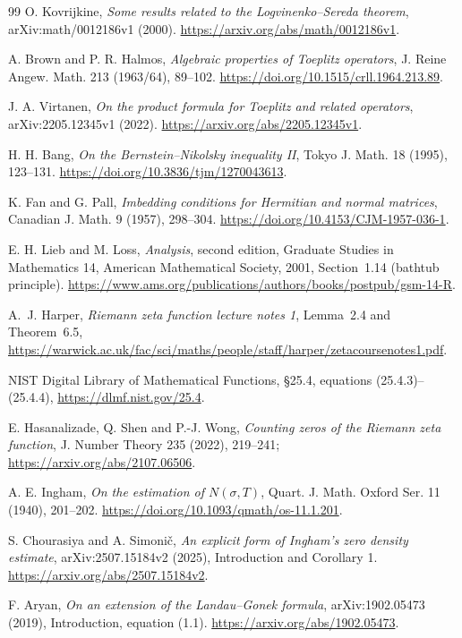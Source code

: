 \documentclass[11pt]{article}
\theoremstyle{remark}
\begin{document}
\begin{thebibliography}{99}
O. Kovrijkine,
\emph{Some results related to the Logvinenko--Sereda theorem},
arXiv:math/0012186v1 (2000).
\url{https://arxiv.org/abs/math/0012186v1}.

A. Brown and P. R. Halmos,
\emph{Algebraic properties of Toeplitz operators},
J. Reine Angew. Math. 213 (1963/64), 89--102.
\url{https://doi.org/10.1515/crll.1964.213.89}.

J. A. Virtanen,
\emph{On the product formula for Toeplitz and related operators},
arXiv:2205.12345v1 (2022).
\url{https://arxiv.org/abs/2205.12345v1}.

H. H. Bang,
\emph{On the Bernstein--Nikolsky inequality II},
Tokyo J. Math. 18 (1995), 123--131.
\url{https://doi.org/10.3836/tjm/1270043613}.


K. Fan and G. Pall, \emph{Imbedding conditions for Hermitian and normal
matrices}, Canadian J. Math. 9 (1957), 298--304.
\url{https://doi.org/10.4153/CJM-1957-036-1}.

E. H. Lieb and M. Loss, \emph{Analysis}, second edition,
Graduate Studies in Mathematics 14, American Mathematical Society, 2001,
Section~1.14 (bathtub principle).
\url{https://www.ams.org/publications/authors/books/postpub/gsm-14-R}.

A.~J. Harper, \emph{Riemann zeta function lecture notes 1},
Lemma~2.4 and Theorem~6.5,
\url{https://warwick.ac.uk/fac/sci/maths/people/staff/harper/zetacoursenotes1.pdf}.

NIST Digital Library of Mathematical Functions,
\S25.4, equations (25.4.3)--(25.4.4),
\url{https://dlmf.nist.gov/25.4}.

E. Hasanalizade, Q. Shen and P.-J. Wong,
\emph{Counting zeros of the Riemann zeta function},
J. Number Theory 235 (2022), 219--241;
\url{https://arxiv.org/abs/2107.06506}.

A. E. Ingham, \emph{On the estimation of $N(\sigma,T)$},
Quart. J. Math. Oxford Ser. 11 (1940), 201--202.
\url{https://doi.org/10.1093/qmath/os-11.1.201}.

S. Chourasiya and A. Simoni\v{c},
\emph{An explicit form of Ingham's zero density estimate},
arXiv:2507.15184v2 (2025), Introduction and Corollary 1.
\url{https://arxiv.org/abs/2507.15184v2}.

F. Aryan, \emph{On an extension of the Landau--Gonek formula},
arXiv:1902.05473 (2019), Introduction, equation (1.1).
\url{https://arxiv.org/abs/1902.05473}.


\end{thebibliography}
\end{document}
